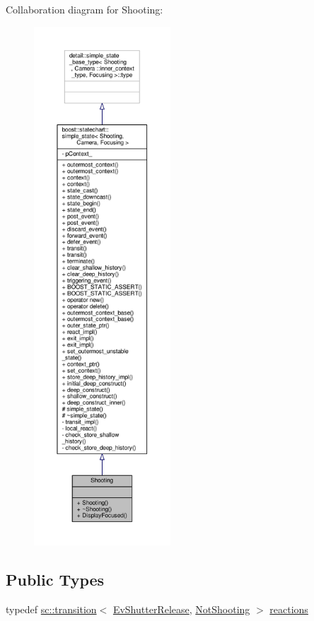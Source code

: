 Collaboration diagram for Shooting\+:
\nopagebreak
\begin{figure}[H]
\begin{center}
\leavevmode
\includegraphics[height=550pt]{struct_shooting__coll__graph}
\end{center}
\end{figure}
\subsection*{Public Types}
\begin{DoxyCompactItemize}
\item 
typedef \mbox{\hyperlink{classboost_1_1statechart_1_1transition}{sc\+::transition}}$<$ \mbox{\hyperlink{struct_ev_shutter_release}{Ev\+Shutter\+Release}}, \mbox{\hyperlink{struct_not_shooting}{Not\+Shooting}} $>$ \mbox{\hyperlink{struct_shooting_a7c35ff4b8df15c37a351043f46f09ad3}{reactions}}
\end{DoxyCompactItemize}
